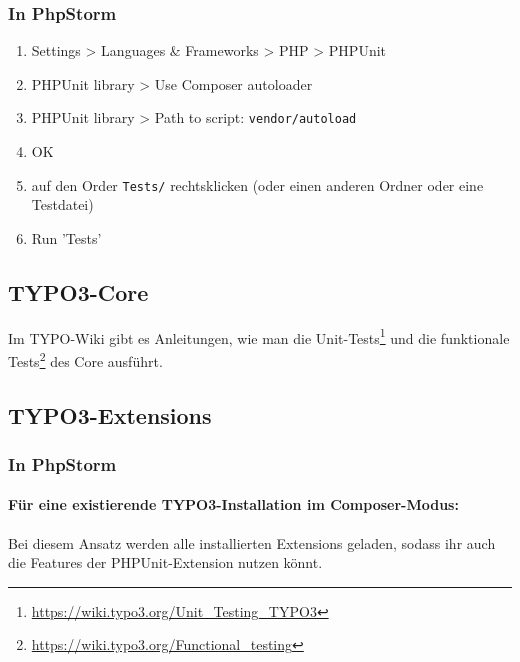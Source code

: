 \documentclass[a4paper,10pt,headsepline]{scrartcl}
\begin{document}
\subsubsection{In PhpStorm}
\begin{enumerate}
  \item Settings > Languages \& Frameworks > PHP > PHPUnit
  \item PHPUnit library > Use Composer autoloader
  \item PHPUnit library > Path to script: \texttt{vendor/autoload}
  \item OK
  \item auf den Order \texttt{Tests/} rechtsklicken (oder einen anderen Ordner oder eine Testdatei)
  \item Run 'Tests'
\end{enumerate}


\subsection{TYPO3-Core}

Im TYPO-Wiki gibt es Anleitungen, wie man die Unit-Tests\footnote{\url{https://wiki.typo3.org/Unit_Testing_TYPO3}} und die funktionale Tests\footnote{\url{https://wiki.typo3.org/Functional_testing}} des Core ausführt.


\subsection{TYPO3-Extensions}

\subsubsection{In PhpStorm}

\paragraph{Für eine existierende TYPO3-Installation im Composer-Modus:}

Bei diesem Ansatz werden alle installierten Extensions geladen, sodass ihr auch die Features der PHPUnit-Extension nutzen könnt.
\end{document}
